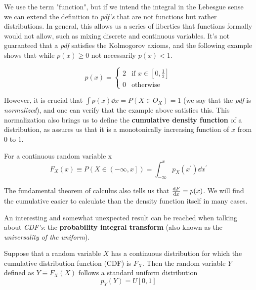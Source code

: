 
We use the term "function", but if we intend the integral in the Lebesgue sense we can extend the definition to \emph{pdf's} that are not functions but rather distributions. In general, this allows us a series of liberties that functions formally would not allow, such as mixing discrete and continuous variables. It's not guaranteed that a \emph{pdf} satisfies the Kolmogorov axioms, and the following example shows that while $p(x)\geq 0$ not necessarily $p(x) < 1$.

	\[
	p(x) = \begin{cases} 2 & \text{if } x \in [0,\frac{1}{2}] \\ 0 &  \text{otherwise} \end{cases}
	\]


However, it is crucial that $\int p(x)\dd x = P(X\in O_X) = 1$ (we say that the \emph{pdf} is \emph{normalized}), and one can verify that the example above satisfies this. This normalization also brings us to define the \textbf{cumulative density function} of a distribution, as assures us that it is a monotonically increasing function of $x$ from $0$ to $1$.

\begin{definition}
	For a continuous random variable x
	\[
	F_X(x)\equiv P\left(X\in \left(-\infty, x\right]\right) = \int_{-\infty}^{x}p_X(x^\prime)\dd x^\prime
	\]
\end{definition}

The fundamental theorem of calculus also tells us that $\frac{\mathrm{d} F}{\mathrm{d} x}=p(x)$. We will find the cumulative easier to calculate than the density function itself in many cases. 

An interesting and somewhat unexpected result can be reached when talking about \emph{CDF's}: the \textbf{probability integral transform} (also known as the \emph{universality of the uniform}).

\begin{theorem}
	Suppose that a random variable $X$ has a continuous distribution for which the cumulative distribution function (CDF) is $F_X$. Then the random variable $Y$ defined as $Y \equiv F_X(X)$ follows a standard uniform distribution
	\[
	p_Y(Y) = U[0,1]
	\]
\label{th:universal_uniform}
\end{theorem}

